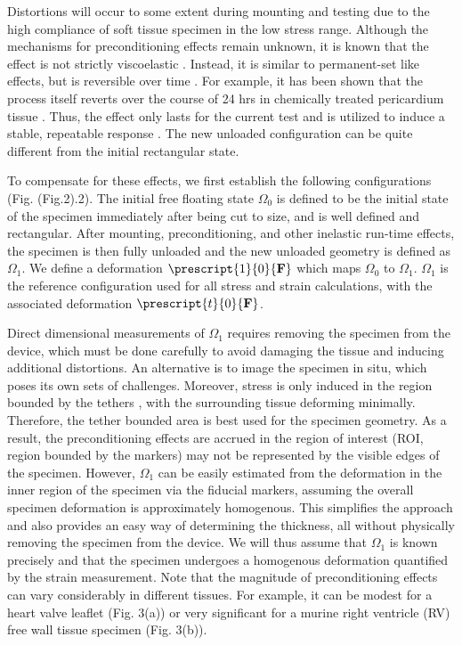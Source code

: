     Distortions will occur to some extent during mounting and testing due to the high compliance of soft tissue specimen in the low stress range. Although the mechanisms for preconditioning effects remain unknown, it is known that the effect is not strictly viscoelastic \cite{sacks_biaxial_2000}\cite{lanir_structural_1979}\cite{lanir_two_1974}. Instead, it is similar to permanent-set like effects, but is reversible over time \cite{sacks_biaxial_2000}. For example, it has been shown that the process itself reverts over the course of 24 hrs in chemically treated pericardium tissue \cite{sacks_biaxial_2000}. Thus, the effect only lasts for the current test and is utilized to induce a stable, repeatable response \cite{sacks_biaxial_2000}\cite{lanir_structural_1979}\cite{lanir_two_1974}. The new unloaded configuration can be quite different from the initial rectangular state.
    
    
    To compensate for these effects, we first establish the following configurations (Fig. (Fig.2).2). The initial free floating state $\Omega_0$ is defined to be the initial state of the specimen immediately after being cut to size, and is well defined and rectangular. After mounting, preconditioning, and other inelastic run-time effects, the specimen is then fully unloaded and the new unloaded geometry is defined as $\Omega_1$. We define a deformation $\prescript{1}{0}{\mathbf{F}}$ which maps $\Omega_0$ to $\Omega_1$. $\Omega_1$ is the reference configuration used for all stress and strain calculations, with the associated deformation $\prescript{t}{0}{\mathbf{F}}$.
    
    
    Direct dimensional measurements of $\Omega_1$ requires removing the specimen from the device, which must be done carefully to avoid damaging the tissue and inducing additional distortions. An alternative is to image the specimen in situ, which poses its own sets of challenges. Moreover, stress is only induced in the region bounded by the tethers \cite{sun_effects_2005}\cite{hu_influence_2013}\cite{simon-allue_unraveling_2014}, with the surrounding tissue deforming minimally. Therefore, the tether bounded area is best used for the specimen geometry. As a result, the preconditioning effects are accrued in the region of interest (ROI, region bounded by the markers) may not be represented by the visible edges of the specimen. However, $\Omega_1$ can be easily estimated from the deformation in the inner region of the specimen via the fiducial markers, assuming the overall specimen deformation is approximately homogenous. This simplifies the approach and also provides an easy way of determining the thickness, all without physically removing the specimen from the device. We will thus assume that $\Omega_1$ is known precisely and that the specimen undergoes a homogenous deformation quantified by the strain measurement. Note that the magnitude of preconditioning effects can vary considerably in different tissues. For example, it can be modest for a heart valve leaflet (Fig. 3(a)) or very significant for a murine right ventricle (RV) free wall tissue specimen (Fig. 3(b)).
    
